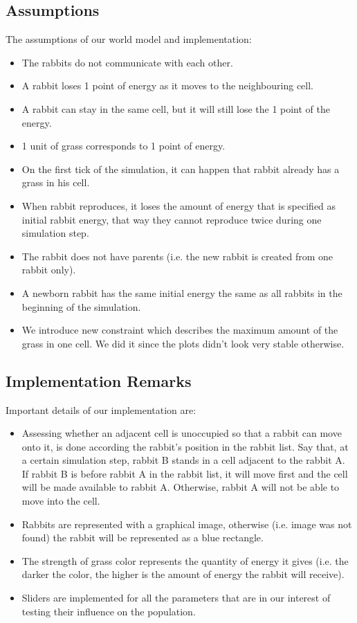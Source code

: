 \documentclass[11pt]{article}
\begin{document}
\subsection{Assumptions}
The assumptions of our world model and implementation:
\begin{itemize}
\item The rabbits do not communicate with each other.
\item A rabbit loses 1 point of energy as it moves to the neighbouring cell.
\item A rabbit can stay in the same cell, but it will still lose the 1 point of the energy.
\item 1 unit of grass corresponds to 1 point of energy.
\item On the first tick of the simulation, it can happen that rabbit already has a grass in his cell.
\item When rabbit reproduces, it loses the amount of energy that is specified as initial rabbit energy, that way they cannot reproduce twice during one simulation step.
\item The rabbit does not have parents (i.e. the new rabbit is created from one rabbit only).
\item A newborn rabbit has the same initial energy the same as all rabbits in the beginning of the simulation.
\item We introduce new constraint which describes the maximum amount of the grass in one cell. We did it since the plots didn't look very stable otherwise. 
\end{itemize}


\subsection{Implementation Remarks}
Important details of our implementation are:
\begin{itemize}
\item Assessing whether an adjacent cell is unoccupied so that a rabbit can move onto it, is done according the rabbit's position in the rabbit list. Say that, at a certain simulation step, rabbit B stands in a cell adjacent to the rabbit A. If rabbit B is before rabbit A in the rabbit list, it will move first and the cell will be made available to rabbit A. Otherwise, rabbit A will not be able to move into the cell. 
\item Rabbits are represented with a graphical image, otherwise (i.e. image was not found) the rabbit will be represented as a blue rectangle.
\item The strength of grass color represents the quantity of energy it gives (i.e. the darker the color, the higher is the amount of energy the rabbit will receive).
\item Sliders are implemented for all the parameters that are in our interest of testing their influence on the population.
\end{itemize}
\end{document}
